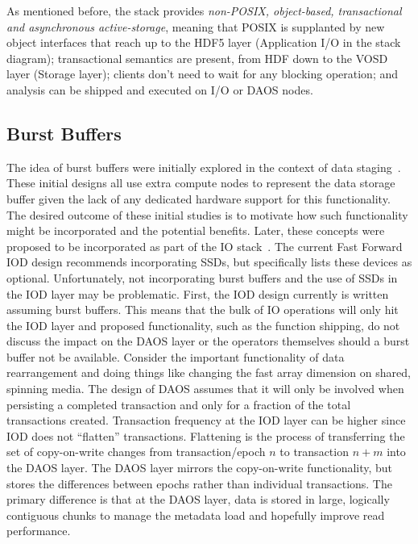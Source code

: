 \documentclass[conference]{IEEEtran}
\begin{document}
As mentioned before, the stack provides \emph{non-POSIX, object-based,
transactional and asynchronous active-storage}, meaning that POSIX is
supplanted by new object interfaces that reach up to the HDF5 layer
(Application I/O in the stack diagram); transactional semantics are present,
from HDF down to the VOSD layer (Storage layer); clients don't need to wait for
any blocking operation; and analysis can be shipped and executed on I/O or DAOS
nodes.

\subsection{Burst Buffers}
\label{sec:burst}

The idea of burst buffers were initially explored in the context of data
staging~\cite{abbasi:2007:datatap,Abbasi:2009:datatap,nisar:2008:staging,zheng:2010:predata}.
These initial designs all use extra compute nodes to represent the data storage
buffer given the lack of any dedicated hardware support for this functionality.
The desired outcome of these initial studies is to motivate how such
functionality might be incorporated and the potential benefits.  Later, these
concepts were proposed to be incorporated as part of the IO
stack~\cite{nowoczynski:2008:zest,bent:2012:challenges,bent:2012:burst-buffer}.
The current Fast Forward IOD design recommends incorporating SSDs, but
specifically lists these devices as optional. Unfortunately, not incorporating
burst buffers and the use of SSDs in the IOD layer may be problematic.  First,
the IOD design currently is written assuming burst buffers. This means that the
bulk of IO operations will only hit the IOD layer and proposed functionality,
such as the function shipping, do not discuss the impact on the DAOS layer or
the operators themselves should a burst buffer not be available.  Consider the
important functionality of data rearrangement and doing things like changing
the fast array dimension on shared, spinning media.  The design of DAOS assumes
that it will only be involved when persisting a completed transaction and only
for a fraction of the total transactions created.  Transaction frequency at the
IOD layer can be higher since IOD does not ``flatten'' transactions. Flattening
is the process of transferring the set of copy-on-write changes from
transaction/epoch $n$ to transaction $n+m$ into the DAOS layer. The DAOS layer
mirrors the copy-on-write functionality, but stores the differences between
epochs rather than individual transactions. The primary difference is that at
the DAOS layer, data is stored in large, logically contiguous chunks to manage
the metadata load and hopefully improve read performance.
\end{document}
